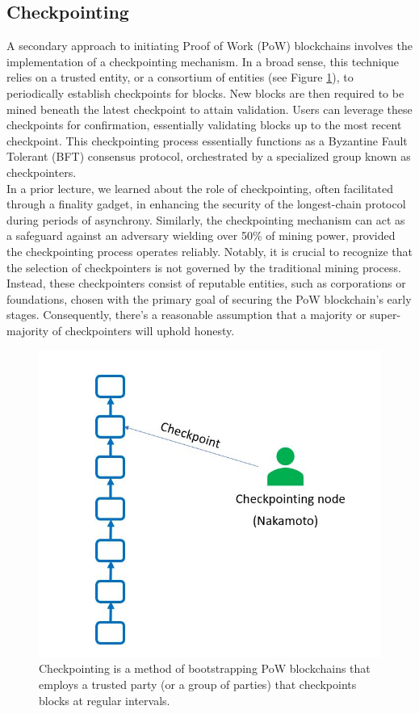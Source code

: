 \subsection{Checkpointing}
A secondary approach to initiating Proof of Work (PoW) blockchains involves the implementation of a checkpointing mechanism. In a broad sense, this technique relies on a trusted entity, or a consortium of entities (see Figure \ref{fig:L18_f2}), to periodically establish checkpoints for blocks. New blocks are then required to be mined beneath the latest checkpoint to attain validation. Users can leverage these checkpoints for confirmation, essentially validating blocks up to the most recent checkpoint. This checkpointing process essentially functions as a Byzantine Fault Tolerant (BFT) consensus protocol, orchestrated by a specialized group known as checkpointers.\\
In a prior lecture, we learned about the role of checkpointing, often facilitated through a finality gadget, in enhancing the security of the longest-chain protocol during periods of asynchrony. Similarly, the checkpointing mechanism can act as a safeguard against an adversary wielding over 50\% of mining power, provided the checkpointing process operates reliably. Notably, it is crucial to recognize that the selection of checkpointers is not governed by the traditional mining process. Instead, these checkpointers consist of reputable entities, such as corporations or foundations, chosen with the primary goal of securing the PoW blockchain's early stages. Consequently, there's a reasonable assumption that a majority or super-majority of checkpointers will uphold honesty.\\
\begin{center}
	\begin{figure}
		\centering
		\includegraphics[width=0.5\linewidth]{Fig/18/F2}
		\caption{Checkpointing is a method of bootstrapping PoW blockchains that employs a trusted party (or a group of parties) that checkpoints blocks at regular intervals.}
		\label{fig:L18_f2}
	\end{figure}
\end{center}
